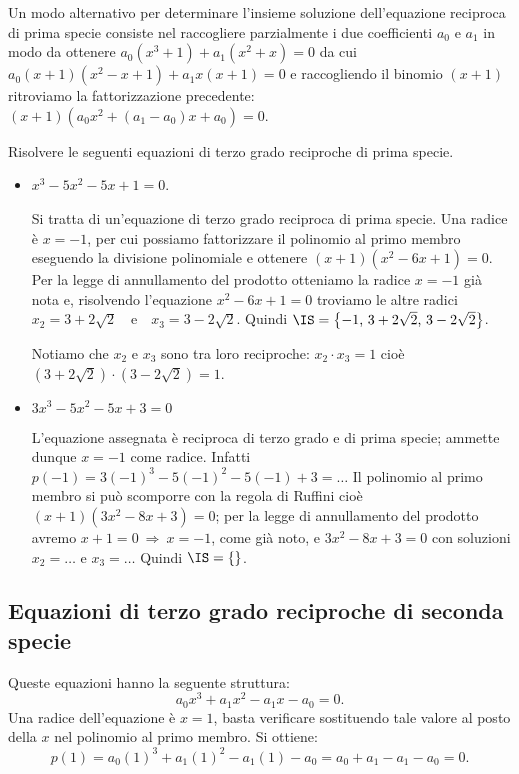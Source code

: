 Un modo alternativo per determinare l'insieme soluzione dell'equazione reciproca di prima specie consiste nel raccogliere parzialmente i due coefficienti $a_0$ e $a_1$ in modo da ottenere $a_0\left(x^3+1\right)+a_1\left(x^2+x\right)=0$ da cui $a_0(x+1)\left(x^2-x+1\right)+a_1x(x+1)=0$ e raccogliendo il binomio $(x+1)$ ritroviamo la fattorizzazione precedente: $(x+1) \left(a_0x^2+(a_1-a_0)x+a_0\right)=0$.
\begin{exrig}
 \begin{esempio}
 Risolvere le seguenti equazioni di terzo grado reciproche di prima specie.

 \begin{itemize}
 \item $x^3-5x^2-5x+1=0$.

 Si tratta di un'equazione di terzo grado reciproca di prima specie. Una radice è $x=-1$, per cui possiamo fattorizzare il polinomio al primo membro eseguendo la divisione polinomiale e ottenere $(x+1)\left(x^2-6x+1\right)=0$. Per la legge di annullamento del prodotto otteniamo la radice $x=-1$ già nota e, risolvendo l'equazione $x^2-6x+1=0$ troviamo le altre radici $x_2=3+2\sqrt 2$~~e~~$x_3=3-2\sqrt 2$. Quindi $\IS=\left\{-1\text{, }3+2\sqrt 2\text{, }3-2\sqrt 2\right\}$.

 Notiamo che $x_2$ e $x_3$ sono tra loro reciproche: $x_2 \cdot x_3=1$ cioè $(3+2\sqrt 2)\cdot (3-2\sqrt 2)=1$.

 \item $3x^3-5x^2-5x+3=0$

 L'equazione assegnata è reciproca di terzo grado e di prima specie; ammette dunque $x=-1$ come radice. Infatti $p(-1)=3(-1)^3-5(-1)^2-5(-1)+3=\ldots$ Il polinomio al primo membro si può scomporre con la regola di Ruffini cioè $(x+1)\left(3x^2-8x+3\right)=0$; per la legge di annullamento del prodotto avremo $x+1=0\:\Rightarrow\: x=-1$, come già noto, e $3x^2-8x+3=0$ con soluzioni $x_2=\ldots $ e $x_3=\ldots$ Quindi $\IS=\{\dotfill \}$.
 \end{itemize}
 \end{esempio}
\end{exrig}
\ovalbox{\risolvii \ref{ese:5.38}, \ref{ese:5.39}, \ref{ese:5.40}, \ref{ese:5.41}}

\subsection{Equazioni di terzo grado reciproche di seconda specie}

Queste equazioni hanno la seguente struttura:
\[a_0x^3+a_1x^2-a_1x-a_0=0.\]
Una radice dell'equazione è $x=1$, basta verificare sostituendo tale valore al posto della $x$ nel polinomio al primo membro. Si ottiene: \[p(1)=a_0(1)^3+a_1(1)^2-a_1(1)-a_0=a_0+a_1-a_1-a_0=0.\]

